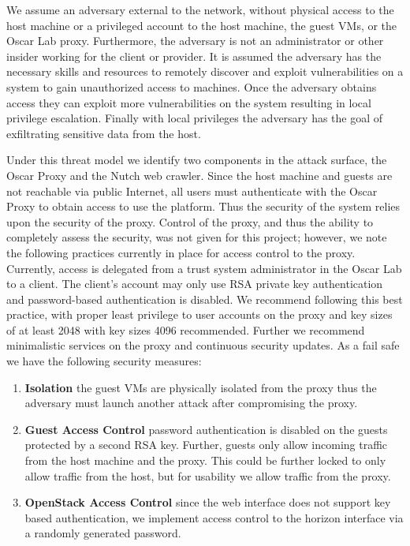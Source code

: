  We assume an adversary external to the network,
without physical access to the host machine or a privileged account to
the host machine, the guest VMs, or the Oscar Lab proxy. Furthermore,
the adversary is not an administrator or other insider working for the
client or provider. It is assumed the adversary has the necessary skills
and resources to remotely discover and exploit vulnerabilities on a system
to gain unauthorized access to machines. Once the adversary obtains
access they can exploit more vulnerabilities on the system resulting in
local privilege escalation. Finally with local privileges the adversary
has the goal of exfiltrating sensitive data from the host.

Under this threat model we identify two components in the attack
surface, the Oscar Proxy and the Nutch web crawler. Since the host
machine and guests are not reachable via public Internet, all users must
authenticate with the Oscar Proxy to obtain access to use the platform.
Thus the security of the system relies upon the security of the proxy.
Control of the proxy, and thus the ability to completely assess the
security, was not given for this project; however, we note the following
practices currently in place for access control to the proxy. Currently,
access is delegated from a trust system administrator in the Oscar Lab
to a client. The client's account may only use RSA private key
authentication and password-based authentication is disabled. We
recommend following this best practice, with proper least privilege to
user accounts on the proxy and key sizes of at least 2048 with key sizes
4096 recommended. Further we recommend minimalistic services on the
proxy and continuous security updates. As a fail safe we have the
following security measures:

\begin{enumerate}
  \item \textbf{Isolation} the guest VMs are physically isolated from the
proxy thus the adversary must launch another attack after compromising
the proxy.
  \item \textbf{Guest Access Control} password authentication is
disabled on the guests protected by a second RSA key. Further, guests
only allow incoming traffic from the host machine and the proxy. This
could be further locked to only allow traffic from the host, but for
usability we allow traffic from the proxy.
  \item \textbf{OpenStack Access Control} since the web interface does
not support key based authentication, we implement access control to the
horizon interface via a randomly generated password.
\end{enumerate}


